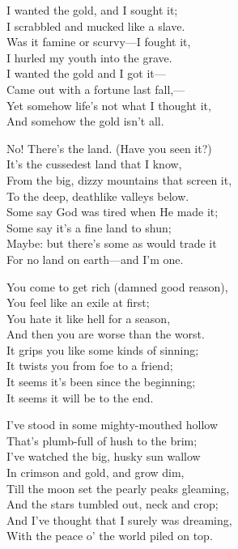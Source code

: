 
\begin{poemblock}
I wanted the gold, and I sought it;\\
\idt I scrabbled and mucked like a slave.\\
Was it famine or scurvy—I fought it,\\
\idt I hurled my youth into the grave.\\
I wanted the gold and I got it—\\
\idt Came out with a fortune last fall,—\\
Yet somehow life's not what I thought it,\\
\idt And somehow the gold isn't all.

No! There's the land. (Have you seen it?)\\
\idt It's the cussedest land that I know,\\
From the big, dizzy mountains that screen it,\\
\idt To the deep, deathlike valleys below.\\
Some say God was tired when He made it;\\
\idt Some say it's a fine land to shun;\\
Maybe: but there's some as would trade it\\
\idt For no land on earth—and I'm one.

You come to get rich (damned good reason),\\
\idt You feel like an exile at first;\\
You hate it like hell for a season,\\
\idt And then you are worse than the worst.\\
It grips you like some kinds of sinning;\\
\idt It twists you from foe to a friend;\\
It seems it's been since the beginning;\\
\idt It seems it will be to the end.

I've stood in some mighty-mouthed hollow\\
\idt That's plumb-full of hush to the brim;\\
I've watched the big, husky sun wallow\\
\idt In crimson and gold, and grow dim,\\
Till the moon set the pearly peaks gleaming,\\
\idt And the stars tumbled out, neck and crop;\\
And I've thought that I surely was dreaming,\\
\idt With the peace o' the world piled on top.


\end{poemblock}
